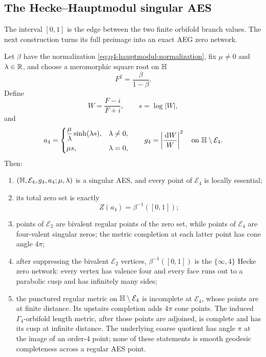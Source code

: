 \subsection{The Hecke--Hauptmodul singular AES}

The interval $[0,1]$ is the edge between the two finite orbifold branch values.
The next construction turns its full preimage into an exact AEG zero network.

\begin{theorem}[$q=4$ Hecke zero network]
\label{thm:q4-hecke-zero-network}
Let $\beta$ have the normalization
\eqref{eq:q4-hauptmodul-normalization}, fix $\mu\ne0$ and $\lambda\in\mathbb{R}$, and
choose a meromorphic square root on $\mathbb{H}$
\begin{equation}
 F^2=\frac{\beta}{1-\beta}.
 \label{eq:q4-square-root}
\end{equation}
Define
\begin{equation}
 W=\frac{F-i}{F+i},
 \qquad
 s=\log|W|,
 \label{eq:q4-cayley-coordinate}
\end{equation}
and
\begin{equation}
 a_4=
 \begin{cases}
 \dfrac{\mu}{\lambda}\sinh(\lambda s),&\lambda\ne0,\\[6pt]
 \mu s,&\lambda=0,
 \end{cases}
 \qquad
 g_4=\left|\frac{\,\mathrm{d} W}{W}\right|^2
 \quad\text{on }\mathbb{H}\setminus\mathcal E_4.
 \label{eq:q4-aeg-data}
\end{equation}
Then:
\begin{enumerate}
\item $(\mathbb{H},\mathcal E_4,g_4,a_4;\mu,\lambda)$ is a singular AES, and every
point of $\mathcal E_4$ is locally essential;
\item its total zero set is exactly
\begin{equation}
 Z(a_4)=\beta^{-1}([0,1]);
 \label{eq:q4-zero-dessin}
\end{equation}
\item points of $\mathcal E_2$ are bivalent regular points of the zero set, while
points of $\mathcal E_4$ are four-valent singular zeros; the metric completion at
each latter point has cone angle $4\pi$;
\item after suppressing the bivalent $\mathcal E_2$ vertices,
$\beta^{-1}([0,1])$ is the $\{\infty,4\}$ Hecke zero network: every vertex has
valence four and every face runs out to a parabolic cusp and has infinitely many
sides;
\item the punctured regular metric on $\mathbb{H}\setminus\mathcal E_4$ is incomplete at
$\mathcal E_4$, whose points are at finite distance.  Its upstairs completion adds
$4\pi$ cone points.  The induced $\Gamma_4$-orbifold length metric, after those
points are adjoined, is complete and has its cusp at infinite distance.  The
underlying coarse quotient has angle $\pi$ at the image of an order-$4$ point;
none of these statements is smooth geodesic completeness across a regular AES
point.
\end{enumerate}
\end{theorem}

